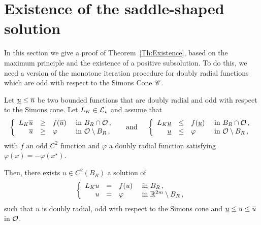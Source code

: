 \section{Existence of the saddle-shaped solution}
\label{Sec:Existence}


In this section we give a proof of Theorem~\ref{Th:Existence}, based on the maximum principle and the existence of a positive subsolution. To do this, we need a version of the monotone iteration procedure for doubly radial functions which are odd with respect to the Simons Cone $\mathscr{C}$.

\begin{proposition}
	\label{Prop:MonotoneIterationOdd}
	Let $\underline{u} \leq \overline{u}$ be two bounded functions that are doubly radial and odd with respect to the Simons cone. Let $L_K\in \mathcal{L}_\star$  and assume that
	$$
	\left\{\begin{array}{rcll}
	L_K\overline{u} & \geq & f(\overline{u}) & \textrm{ in } B_R \cap \mathcal{O}\,, \\
	\overline{u} & \geq & \varphi & \textrm{ in } \mathcal{O} \setminus B_R\,, 
	\end{array} \right.
	\quad \textrm{ and } \quad 
	\left\{\begin{array}{rcll}
	L_K\underline{u} & \leq & f(\underline{u}) & \textrm{ in } B_R \cap \mathcal{O}\,, \\
	\underline{u} & \leq & \varphi & \textrm{ in } \mathcal{O} \setminus B_R\,, 
	\end{array} \right.
	$$
	with $f$ an odd $C^2$ function and $\varphi$ a doubly radial  function satisfying $\varphi (x) = - \varphi(x^\star)$.
	
	Then, there exists $u\in C^2(B_R)$ a solution of
	$$
	\left\{\begin{array}{rcll}
	L_K u & = & f(u) & \textrm{ in } B_R\,, \\
	u &=& \varphi &  \textrm{ in } \mathbb{R}^{2m} \setminus B_R\,, 
	\end{array} \right.
	$$
	such that $u$ is doubly radial, odd with respect to the Simons cone and  $\underline{u} \leq u \leq \overline{u}$ in $\mathcal{O}$.
\end{proposition}

